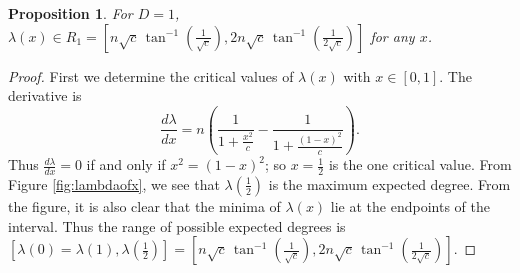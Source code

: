 \documentclass[a4paper,10pt]{article}
\newtheorem{prop}{Proposition}
\begin{document}
\begin{prop}
\label{prop:R1}
 For $D=1$, $\lambda(x) \in R_1 = \left[n \sqrt{c}\, \tan^{-1}\left(\frac{1}{\sqrt{c}}\right),2 n\sqrt{c}\,  \tan^{-1}\left(\frac{1}{2 \sqrt{c}}\right)\right]$ for any $x$.
 \end{prop}
\begin{proof}
First we determine the critical values of $\lambda(x)$ with $x \in [0, 1]$. The derivative is
\begin{equation}
 \frac{d\lambda}{dx} = n\left(\frac{1}{1+\frac{x^2}{c}} - \frac{1}{1+\frac{(1-x)^2}{c}} \right).
\end{equation}
Thus $\frac{d\lambda}{dx} = 0$ if and only if $x^2 = (1 - x)^2$; so $x=\frac{1}{2}$ is the one critical value. From Figure \ref{fig:lambdaofx}, we see that $\lambda(\frac{1}{2})$ is the maximum expected degree. From the figure, it is also clear that the minima of $\lambda(x)$ lie at the endpoints of the interval. Thus the range of possible expected degrees is 
$[\lambda(0)=\lambda(1), \lambda(\frac{1}{2})] = \left[n \sqrt{c}\, \tan^{-1}\left(\frac{1}{\sqrt{c}}\right),2 n\sqrt{c}\,  \tan^{-1}\left(\frac{1}{2 \sqrt{c}}\right)\right]$. 
\end{proof}
\end{document}
